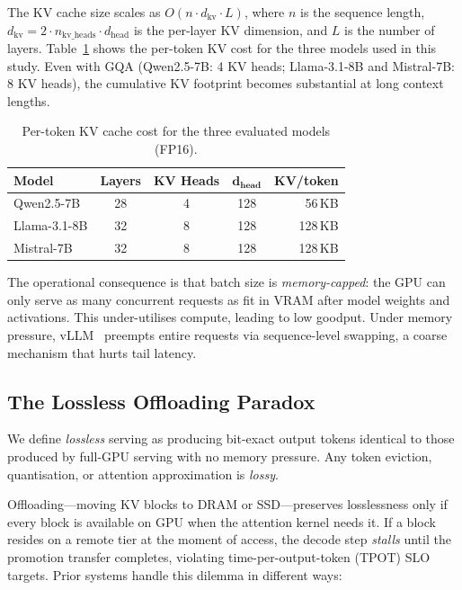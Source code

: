 \documentclass[acmsmall,nonacm,screen]{acmart}
\begin{document}
The KV cache size scales as $O(n \cdot d_\text{kv} \cdot L)$, where $n$ is
the sequence length, $d_\text{kv} = 2 \cdot n_\text{kv\_heads} \cdot
d_\text{head}$ is the per-layer KV dimension, and $L$ is the number of
layers.  Table~\ref{tab:kv_sizing} shows the per-token KV cost for the three
models used in this study.  Even with GQA (Qwen2.5-7B: 4 KV heads;
Llama-3.1-8B and Mistral-7B: 8 KV heads), the cumulative KV footprint
becomes substantial at long context lengths.

\begin{table}[t]
\centering
\caption{Per-token KV cache cost for the three evaluated models (FP16).}
\label{tab:kv_sizing}
\begin{tabular}{lcccr}
\toprule
\textbf{Model} & \textbf{Layers} & \textbf{KV Heads} & $\mathbf{d_\text{head}}$ &
  \textbf{KV/token} \\
\midrule
Qwen2.5-7B   & 28 & 4  & 128 & 56\,KB \\
Llama-3.1-8B & 32 & 8  & 128 & 128\,KB \\
Mistral-7B   & 32 & 8  & 128 & 128\,KB \\
\bottomrule
\end{tabular}
\end{table}

The operational consequence is that batch size is \emph{memory-capped}:
the GPU can only serve as many concurrent requests as fit in VRAM after
model weights and activations.  This under-utilises compute, leading to
low goodput.  Under memory pressure, vLLM~\cite{kwon2023vllm} preempts
entire requests via sequence-level swapping, a coarse mechanism that
hurts tail latency.

\subsection{The Lossless Offloading Paradox}\label{sec:bg:paradox}

We define \emph{lossless} serving as producing bit-exact output tokens
identical to those produced by full-GPU serving with no memory pressure.
Any token eviction, quantisation, or attention approximation is \emph{lossy}.

Offloading---moving KV blocks to DRAM or SSD---preserves losslessness only
if every block is available on GPU when the attention kernel needs it.  If
a block resides on a remote tier at the moment of access, the decode step
\emph{stalls} until the promotion transfer completes, violating time-per-output-token (TPOT) SLO targets.  Prior systems handle this dilemma in
different ways:
\end{document}

